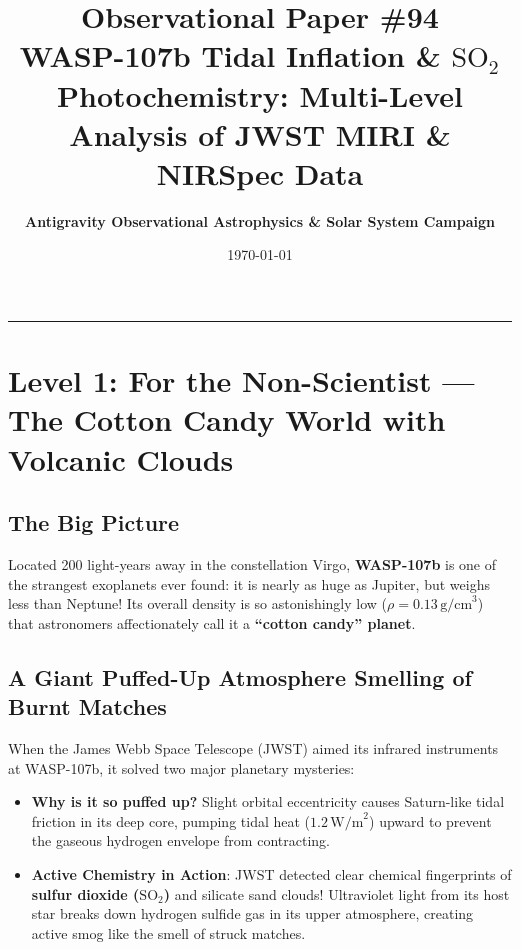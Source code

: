 \documentclass[11pt,a4paper]{article}
\title{\Huge \textbf{Observational Paper \#94}\\ \Large WASP-107b Tidal Inflation \& $\text{SO}_2$ Photochemistry: Multi-Level Analysis of JWST MIRI \& NIRSpec Data}
\author{\textbf{Antigravity Observational Astrophysics \& Solar System Campaign}}
\date{\today}
\begin{document}
\maketitle

\vspace{-1em}
\begin{center}
\rule{\textwidth}{1.5pt}
\end{center}

\section*{Level 1: For the Non-Scientist — The Cotton Candy World with Volcanic Clouds}

\subsection*{The Big Picture}
Located 200 light-years away in the constellation Virgo, \textbf{WASP-107b} is one of the strangest exoplanets ever found: it is nearly as huge as Jupiter, but weighs less than Neptune! Its overall density is so astonishingly low ($\rho = 0.13\,\text{g/cm}^3$) that astronomers affectionately call it a \textbf{``cotton candy'' planet}.

\subsection*{A Giant Puffed-Up Atmosphere Smelling of Burnt Matches}
When the James Webb Space Telescope (JWST) aimed its infrared instruments at WASP-107b, it solved two major planetary mysteries:
\begin{itemize}
\item \textbf{Why is it so puffed up?} Slight orbital eccentricity causes Saturn-like tidal friction in its deep core, pumping tidal heat ($1.2\,\text{W/m}^2$) upward to prevent the gaseous hydrogen envelope from contracting.
\item \textbf{Active Chemistry in Action}: JWST detected clear chemical fingerprints of \textbf{sulfur dioxide ($\mathrm{SO}_2$)} and silicate sand clouds! Ultraviolet light from its host star breaks down hydrogen sulfide gas in its upper atmosphere, creating active smog like the smell of struck matches.
\end{itemize}
\end{document}
